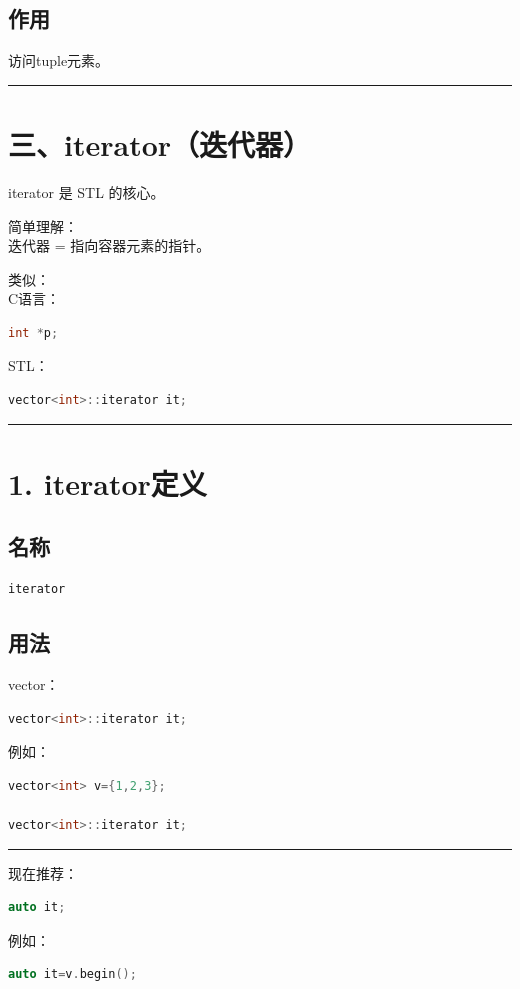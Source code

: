 \documentclass[10pt,twocolumn]{extarticle}
\begin{document}
\subsection{作用}
访问tuple元素。

\noindent\rule{\linewidth}{0.4pt}

\section{三、iterator（迭代器）}

iterator 是 STL 的核心。

简单理解：\\
迭代器 = 指向容器元素的指针。

类似：\\
C语言：
\begin{lstlisting}[language=C++]
int *p;
\end{lstlisting}
STL：
\begin{lstlisting}[language=C++]
vector<int>::iterator it;
\end{lstlisting}

\noindent\rule{\linewidth}{0.4pt}

\section{1. iterator定义}

\subsection{名称}
\begin{lstlisting}[language=C++]
iterator
\end{lstlisting}

\subsection{用法}
vector：
\begin{lstlisting}[language=C++]
vector<int>::iterator it;
\end{lstlisting}
例如：
\begin{lstlisting}[language=C++]
vector<int> v={1,2,3};

vector<int>::iterator it;
\end{lstlisting}

\noindent\rule{\linewidth}{0.4pt}

现在推荐：
\begin{lstlisting}[language=C++]
auto it;
\end{lstlisting}
例如：
\begin{lstlisting}[language=C++]
auto it=v.begin();
\end{lstlisting}
\end{document}
